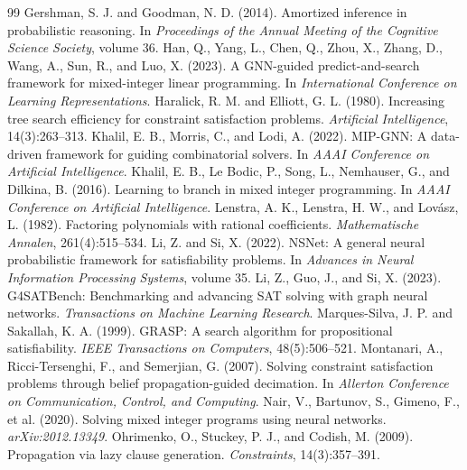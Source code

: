 \documentclass[final,5p,times,twocolumn]{elsarticle}
\begin{document}
\begin{thebibliography}{99}
 Gershman, S. J. and Goodman, N. D. (2014). Amortized inference in probabilistic reasoning. In \emph{Proceedings of the Annual Meeting of the Cognitive Science Society}, volume 36.
 Han, Q., Yang, L., Chen, Q., Zhou, X., Zhang, D., Wang, A., Sun, R., and Luo, X. (2023). A GNN-guided predict-and-search framework for mixed-integer linear programming. In \emph{International Conference on Learning Representations}.
 Haralick, R. M. and Elliott, G. L. (1980). Increasing tree search efficiency for constraint satisfaction problems. \emph{Artificial Intelligence}, 14(3):263--313.
 Khalil, E. B., Morris, C., and Lodi, A. (2022). MIP-GNN: A data-driven framework for guiding combinatorial solvers. In \emph{AAAI Conference on Artificial Intelligence}.
 Khalil, E. B., Le Bodic, P., Song, L., Nemhauser, G., and Dilkina, B. (2016). Learning to branch in mixed integer programming. In \emph{AAAI Conference on Artificial Intelligence}.
 Lenstra, A. K., Lenstra, H. W., and Lov\'asz, L. (1982). Factoring polynomials with rational coefficients. \emph{Mathematische Annalen}, 261(4):515--534.
 Li, Z. and Si, X. (2022). NSNet: A general neural probabilistic framework for satisfiability problems. In \emph{Advances in Neural Information Processing Systems}, volume 35.
 Li, Z., Guo, J., and Si, X. (2023). G4SATBench: Benchmarking and advancing SAT solving with graph neural networks. \emph{Transactions on Machine Learning Research}.
 Marques-Silva, J. P. and Sakallah, K. A. (1999). GRASP: A search algorithm for propositional satisfiability. \emph{IEEE Transactions on Computers}, 48(5):506--521.
 Montanari, A., Ricci-Tersenghi, F., and Semerjian, G. (2007). Solving constraint satisfaction problems through belief propagation-guided decimation. In \emph{Allerton Conference on Communication, Control, and Computing}.
 Nair, V., Bartunov, S., Gimeno, F., et al. (2020). Solving mixed integer programs using neural networks. \emph{arXiv:2012.13349}.
 Ohrimenko, O., Stuckey, P. J., and Codish, M. (2009). Propagation via lazy clause generation. \emph{Constraints}, 14(3):357--391.

\end{thebibliography}
\end{document}
